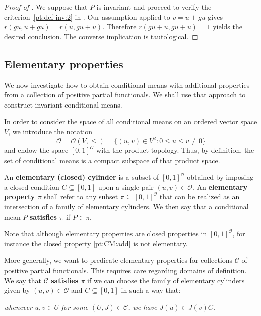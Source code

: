 \documentclass[11pt]{amsart}
\numberwithin{equation}{section}
\theoremstyle{definition}
\theoremstyle{definition}
\newcommand*{\sC}{\mathscr{C}}
\newcommand*{\sO}{\mathscr{O}}
\newcommand*{\se}{\subseteq}
\begin{document}
\begin{proof}[Proof of ]
We suppose that $P$ is invariant and proceed to verify the criterion~\ref{pt:def-inv:2} in . Our assumption applied to $v=u + g u$ gives $r(g u, u+g u) = r(u, g u + u)$. Therefore $r(g u+u, g u + u)=1$ yields the desired conclusion. The converse implication is tautological.
\end{proof}


\subsection{Elementary properties}%
We now investigate how to obtain conditional means with additional properties from a collection of positive partial functionals. We shall use that approach to construct invariant conditional means.

In order to consider the space of all conditional means on an ordered vector space $V$, we introduce the notation
\begin{equation*}
\sO = \sO(V, \leq) = \big\{ (u, v) \in V^2 : 0\leq u \leq v \neq 0 \big\}
\end{equation*}
and endow the space $[0,1]^{\sO}$ with the product topology. Thus, by definition, the set of conditional means is a compact subspace of that product space.

An \textbf{elementary (closed) cylinder} is a subset of $[0,1]^{\sO}$ obtained by imposing a closed condition $C\se [0, 1]$ upon a single pair $(u, v)\in\sO$. An \textbf{elementary property $\pi$} shall refer to any subset $\pi\se [0,1]^{\sO}$ that can be realized as an intersection of a family of elementary cylinders. We then say that a conditional mean $P$ \textbf{satisfies $\pi$} if $P\in \pi$.

Note that although elementary properties are closed properties in $[0,1]^{\sO}$, for instance the closed property \ref{pt:CM:add} is not elementary.

\medskip
More generally, we want to predicate elementary properties for collections $\sC$ of positive partial functionals. This requires care regarding domains of definition. We say that \textbf{$\sC$ satisfies $\pi$} if we can choose the family of elementary cylinders given by $(u, v)\in\sO$ and $C\se[0,1]$ in such a way that:

\begin{center}
\itshape
whenever $u, v\in U$ for some $(U, J)\in \sC$, we have $J(u) \in J(v) C$.
\upshape
\end{center}
\end{document}

